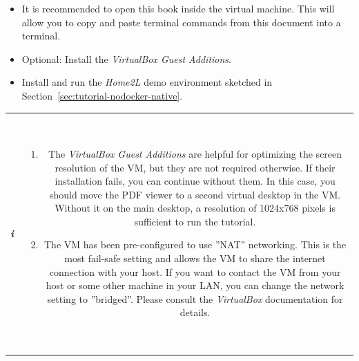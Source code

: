 \documentclass[12pt,english,parskip=half,headheight=19pt]{scrreprt}
\newcommand{\infobox}[1]{
  \par
  \medskip
  \hfill
  \setlength\arrayrulewidth{1pt}
  \begin{tabular}[t]{c|c|}
    \parbox{1.8em}{\hfill\textit{\Huge\textbf{i}\,}}
    &
    \,\parbox{0.89\linewidth}{\setlength{\parskip}{0.5em} \small #1}\,
  \end{tabular}
  \medskip
  \par
}
\newcommand{\idx}[1]{#1\index{#1}}
\newcommand{\refenv}[1]{\hyperref[env:#1]{\texttt{#1}}}        %
\begin{document}
\begin{itemize}[$\blacktriangleright$]
\item
  It is recommended to open this book inside the virtual machine.
  This will allow you to copy and paste terminal commands from this document into a terminal.

\item
  Optional: Install the \textit{VirtualBox Guest Additions}.

\item
  Install and run the \textit{Home2L} demo environment sketched in
  Section~\ref{sec:tutorial-nodocker-native}.

\end{itemize}

\infobox{
  \begin{enumerate}
    \item
      The \textit{VirtualBox Guest Additions} are helpful for optimizing the screen resolution of the
      VM, but they are not required otherwise.
      If their installation fails, you can continue without them.
      In this case, you should move the PDF viewer to a second virtual desktop in the VM.
      Without it on the main desktop, a resolution of 1024x768 pixels is sufficient to run the
      tutorial.
    \item
      The VM has been pre-configured to use ''NAT'' networking. This is the most fail-safe setting and
      allows the VM to share the internet connection with your host. If you want to contact the VM from
      your host or some other machine in your LAN, you can change the network setting to ''bridged''.
      Please consult the \textit{VirtualBox} documentation for details.
    \end{enumerate}
}




%
\end{document}
